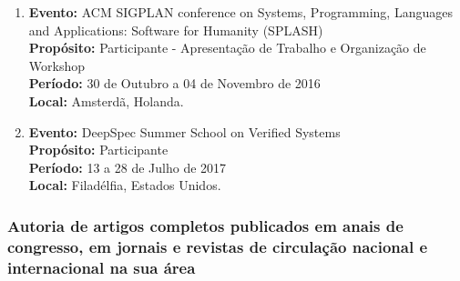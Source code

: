 \documentclass[a4paper,oneside,10pt]{article}
\begin{document}
\begin{enumerate}
\item   \textbf{Evento:} ACM SIGPLAN conference on Systems, Programming, Languages and Applications: Software for Humanity (SPLASH) \mbox{} \\
        \textbf{Propósito:} Participante - Apresentação de Trabalho e Organização de Workshop\\
        \textbf{Período:} 30 de Outubro a 04 de Novembro de 2016\\
        \textbf{Local:} Amsterdã, Holanda.

\item   \textbf{Evento:} DeepSpec Summer School on Verified Systems \mbox{} \\
        \textbf{Propósito:} Participante\\
        \textbf{Período:} 13 a 28 de Julho de 2017\\
        \textbf{Local:} Filadélfia, Estados Unidos.

\end{enumerate}

\subsubsection{Autoria de artigos completos publicados em anais de congresso, em jornais e revistas de circulação nacional e internacional na sua área}
\vspace{0.3cm}
\end{document}
